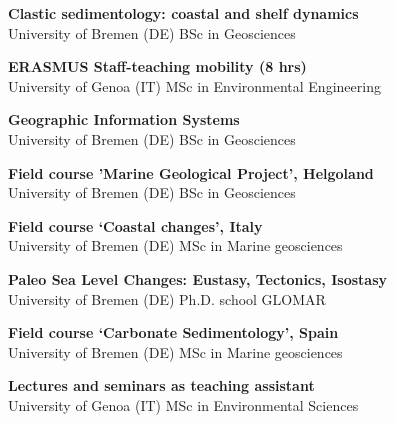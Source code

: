 \documentclass[%
               doublesided,
               paper=a4,
               fontsize=10pt
              ]{my-resume}
\begin{document}
{    \textbf{Clastic sedimentology: coastal and shelf dynamics}\\
        {University of Bremen (DE)} 
        {BSc in Geosciences}
        {}
        
    \textbf{ERASMUS Staff-teaching mobility (8 hrs)}\\
        {University of Genoa (IT)}
        {MSc in Environmental Engineering}
        {}

    \textbf{Geographic Information Systems}\\
        {University of Bremen (DE)}
        {BSc in Geosciences}
        {}
        
    \textbf{Field course 'Marine Geological Project', Helgoland}\\
        {University of Bremen (DE)}
        {BSc in Geosciences}
        {}        
        
    \textbf{Field course ‘Coastal changes’, Italy}\\
        {University of Bremen (DE)}
        {MSc in Marine geosciences}
        {}

    \textbf{Paleo Sea Level Changes: Eustasy, Tectonics, Isostasy}\\
        {University of Bremen (DE)}
        {Ph.D. school GLOMAR}
        {}

    \textbf{Field course ‘Carbonate Sedimentology’, Spain}\\
        {University of Bremen (DE)}
        {MSc in Marine geosciences}
        {}        

    \textbf{Lectures and seminars as teaching assistant}\\
        {University of Genoa (IT)}
        {MSc in Environmental Sciences}
        {}

}      
\makebody

                  
\clearpage


\pagestyle{highlightmain}
\end{document}
